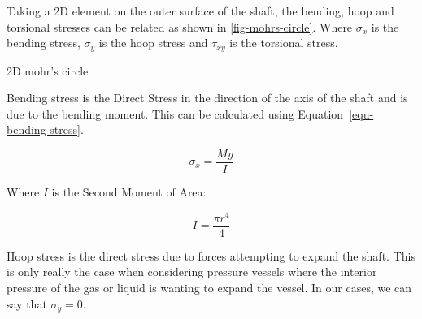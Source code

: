 Taking  a 2D element on the outer surface of the shaft, the bending, hoop and torsional stresses can be related as shown in \cref{fig-mohrs-circle}. Where $\sigma_x$ is the bending stress, $\sigma_y$ is the hoop stress and $\tau_{xy}$ is the torsional stress.

\begin{marginfigure}
  \center{}
  \caption{2D mohr's circle}
  \label{fig-mohrs-circle}
\end{marginfigure}

Bending  stress is the Direct Stress in the direction of the axis of the shaft and is due to the bending moment. This can be calculated using Equation~\ref{equ-bending-stress}.

\begin{equation}
  \sigma_{x} = \frac{My}{I}
  \label{equ-bending-stress}
\end{equation}

Where \(I\) is the Second Moment of Area:

\begin{equation}
  I = \frac{\pi r^4}{4}
\end{equation}

Hoop stress is the direct stress due to forces attempting to expand the shaft. This is only really the case when considering pressure vessels where the interior pressure of the gas or liquid is wanting to expand the vessel. In our cases, we can say that \(\sigma_y = 0\). 

